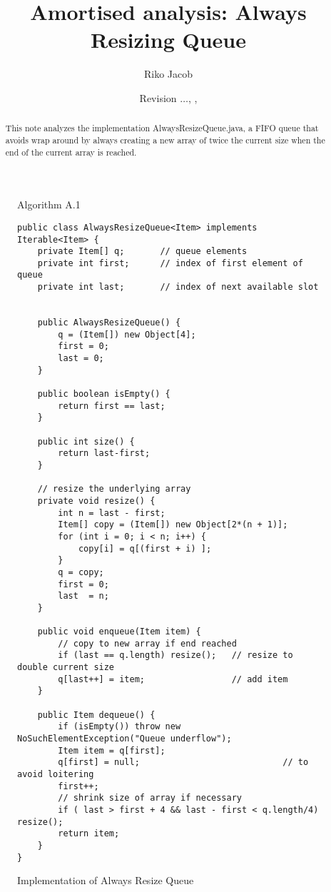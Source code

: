\documentclass{tufte-handout}
\title{Amortised analysis: Always Resizing Queue}
\author{Riko Jacob}
\date{\small Revision {\tt \GITAbrHash}$\ldots$, \GITAuthorDate, \GITAuthorName}
\begin{document}
\maketitle

\begin{abstract}
  This note analyzes the implementation AlwaysResizeQueue.java,
  a FIFO queue that avoids wrap around by always creating a new array of twice the current size when the end of the current array is reached.
\end{abstract}

\begin{figure}

Algorithm A.1 

\small
\begin{lstlisting}[basicstyle=\ttfamily,backgroundcolor=\color{white},
  frame=single,rulecolor=\color{gray!20},framesep=10pt, linewidth=12cm]
public class AlwaysResizeQueue<Item> implements Iterable<Item> {
    private Item[] q;       // queue elements
    private int first;      // index of first element of queue
    private int last;       // index of next available slot


    public AlwaysResizeQueue() {
        q = (Item[]) new Object[4];
        first = 0;
        last = 0;
    }

    public boolean isEmpty() {
        return first == last;
    }

    public int size() {
        return last-first;
    }

    // resize the underlying array
    private void resize() {
        int n = last - first;
        Item[] copy = (Item[]) new Object[2*(n + 1)];
        for (int i = 0; i < n; i++) {
            copy[i] = q[(first + i) ];
        }
        q = copy;
        first = 0;
        last  = n;
    }

    public void enqueue(Item item) {
        // copy to new array if end reached
        if (last == q.length) resize();   // resize to double current size
        q[last++] = item;                 // add item
    }

    public Item dequeue() {
        if (isEmpty()) throw new NoSuchElementException("Queue underflow");
        Item item = q[first];
        q[first] = null;                            // to avoid loitering
        first++;
        // shrink size of array if necessary
        if ( last > first + 4 && last - first < q.length/4) resize(); 
        return item;
    }
}
\end{lstlisting}
\caption{\label{fig:impl}Implementation of Always Resize Queue}
\end{figure}
\end{document}
